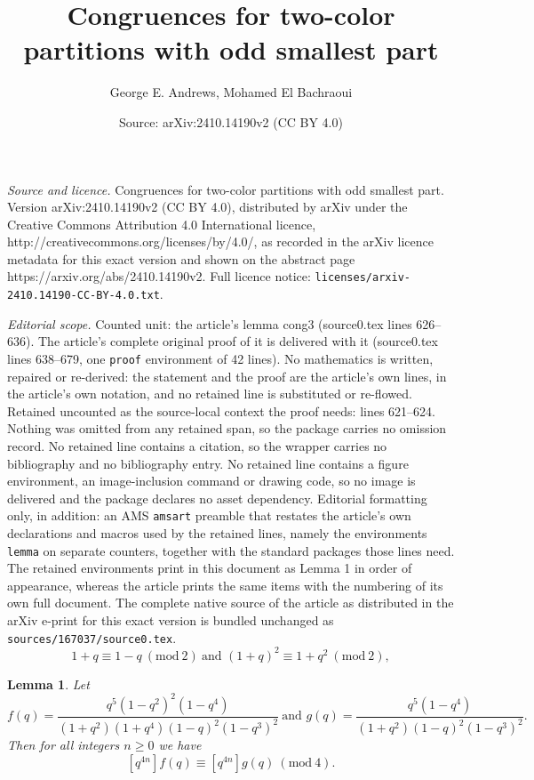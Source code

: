 \documentclass[10pt,a4paper]{amsart}
\title{Congruences for two-color partitions with odd smallest part}
\author{George E. Andrews, Mohamed El Bachraoui}
\date{Source: arXiv:2410.14190v2 (CC BY 4.0)}
\newtheorem{lemma}{Lemma}
\newcommand{\Mod}[1]{\ (\mathrm{mod}\ #1)}
\begin{document}
\maketitle

\noindent\emph{Source and licence.} Congruences for two-color partitions with odd smallest part. Version arXiv:2410.14190v2 (CC BY 4.0), distributed by arXiv under the Creative Commons Attribution 4.0 International licence, http://creativecommons.org/licenses/by/4.0/, as recorded in the arXiv licence metadata for this exact version and shown on the abstract page https://arxiv.org/abs/2410.14190v2. Full licence notice: \texttt{licenses/arxiv-2410.14190-CC-BY-4.0.txt}.\par\smallskip

\noindent\textit{Editorial scope.} Counted unit: the article's lemma cong3 (source0.tex lines 626--636). The article's complete original proof of it is delivered with it (source0.tex lines 638--679, one \texttt{proof} environment of 42 lines). No mathematics is written, repaired or re-derived: the statement and the proof are the article's own lines, in the article's own notation, and no retained line is substituted or re-flowed.  Retained uncounted as the source-local context the proof needs: lines 621--624.  Nothing was omitted from any retained span, so the package carries no omission record.  No retained line contains a citation, so the wrapper carries no bibliography and no bibliography entry.  No retained line contains a figure environment, an image-inclusion command or drawing code, so no image is delivered and the package declares no asset dependency.  Editorial formatting only, in addition: an AMS \texttt{amsart} preamble that restates the article's own declarations and macros used by the retained lines, namely the environments \texttt{lemma} on separate counters, together with the standard packages those lines need.  The retained environments print in this document as Lemma 1 in order of appearance, whereas the article prints the same items with the numbering of its own full document.  The complete native source of the article as distributed in the arXiv e-print for this exact version is bundled unchanged as \texttt{sources/167037/source0.tex}.
\begin{equation}\label{basic-cong mod2}
1+q \equiv 1-q \Mod{2}\ \text{and\ }
(1+q)^2 \equiv 1+q^2\Mod{2},
\end{equation}

\begin{lemma}\label{lem cong3}
Let
\[
f(q)=\frac{q^5(1-q^2)^2(1-q^4)}{(1+q^2)(1+q^4)(1-q)^2(1-q^3)^2}\ \text{and\ }
g(q)=\frac{q^5(1-q^4)}{(1+q^2)(1-q)^2(1-q^3)^2}.
\]
Then for all integers $n\ge0$ we have
\[
[q^{4n}]f(q)\equiv [q^{4n}]g(q)\Mod{4}.
\]
\end{lemma}
\end{document}
